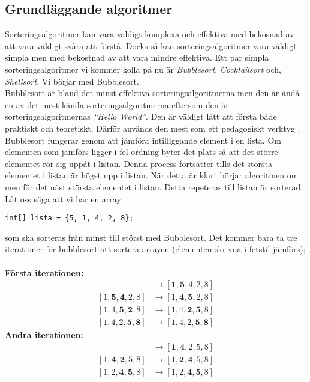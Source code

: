 \documentclass[a4, oneside]{report}
\begin{document}
\subsection{Grundläggande algoritmer}
Sorteringsalgoritmer kan vara väldigt komplexa och effektiva med bekosnad av att vara väldigt svåra att förstå. Docks så kan sorteringsalgoritmer vara väldigt simpla men med bekostnad av att vara mindre effektiva. Ett par simpla sorteringsalgoritmer vi kommer kolla på nu är \textit{Bubblesort}, \textit{Cocktailsort} och, \textit{Shellsort}. Vi börjar med Bubblesort.\\
Bubblesort är bland det minst effektiva sorteringsalgoritmerna men den är ändå en av det mest kända sorteringsalgoritmerna eftersom den är sorteringsalgoritmernas \textit{“Hello World”}. Den är väldigt lätt att förstå både praktiskt och teoretiskt. Därför används den mest som ett pedagogiskt verktyg \cite{8}. Bubblesort fungerar genom att jämföra intilliggande element i en lista. Om elementen som jämförs ligger i fel ordning byter det plats så att det större elementet rör sig uppåt i listan. Denna process fortsätter tills det största elementet i listan är högst upp i listan. När detta är klart börjar algoritmen om men för det näst största elementet i listan. Detta repeteras till listan är sorterad. Låt oss säga att vi har en array 
\begin{lstlisting}[style=mystyle, numbers=none]
 int[] lista = {5, 1, 4, 2, 8};
\end{lstlisting}
som ska sorteras från minst till störst med Bubblesort. Det kommer bara ta tre iterationer för bubblesort att sortera arrayen (elementen skrivna i fetstil jämförs);\\\\
\textbf{Första iterationen:}
\begin{align*}
    [\textbf{5}, \textbf{1}, 4, 2, 8] &\rightarrow [\textbf{1}, \textbf{5}, 4, 2, 8]\\
    [1, \textbf{5}, \textbf{4}, 2, 8] &\rightarrow [1, \textbf{4}, \textbf{5}, 2, 8]\\
    [1, 4, \textbf{5}, \textbf{2}, 8] &\rightarrow [1, 4, \textbf{2}, \textbf{5}, 8]\\
    [1, 4, 2, \textbf{5}, \textbf{8}] &\rightarrow [1, 4, 2, \textbf{5}, \textbf{8}]
\end{align*}
\textbf{Andra iterationen:}
\begin{align*}
    [\textbf{1}, \textbf{4}, 2, 5, 8] &\rightarrow [\textbf{1}, \textbf{4}, 2, 5, 8]\\
    [1, \textbf{4}, \textbf{2}, 5, 8] &\rightarrow [1, \textbf{2}, \textbf{4}, 5, 8]\\
    [1, 2, \textbf{4}, \textbf{5}, 8] &\rightarrow [1, 2, \textbf{4}, \textbf{5}, 8]
\end{align*}
\end{document}
